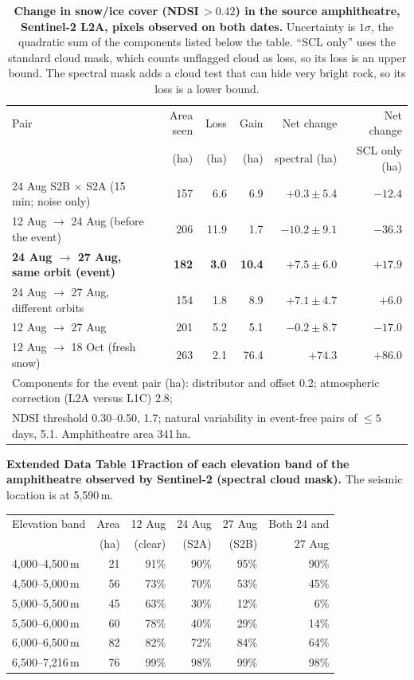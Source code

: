 \documentclass{nature}
\begin{document}
\begin{table}
\caption{\textbf{Change in snow/ice cover (NDSI\,$>0.42$) in the source amphitheatre, Sentinel-2 L2A, pixels observed on both dates.} Uncertainty is $1\sigma$, the quadratic sum of the components listed below the table. ``SCL only'' uses the standard cloud mask, which counts unflagged cloud as loss, so its loss is an upper bound. The spectral mask adds a cloud test that can hide very bright rock, so its loss is a lower bound.}
\centering\small
\begin{tabular}{lrrrrr}
\hline
Pair & Area seen & Loss & Gain & Net change & Net change \\
 & (ha) & (ha) & (ha) & spectral (ha) & SCL only (ha) \\
\hline
24 Aug S2B $\times$ S2A (15\,min; noise only) & 157 & 6.6 & 6.9 & $+0.3\pm5.4$ & $-12.4$ \\
12 Aug $\to$ 24 Aug (before the event) & 206 & 11.9 & 1.7 & $-10.2\pm9.1$ & $-36.3$ \\
\textbf{24 Aug $\to$ 27 Aug, same orbit (event)} & \textbf{182} & \textbf{3.0} & \textbf{10.4} & $\mathbf{+7.5\pm6.0}$ & $\mathbf{+17.9}$ \\
24 Aug $\to$ 27 Aug, different orbits & 154 & 1.8 & 8.9 & $+7.1\pm4.7$ & $+6.0$ \\
12 Aug $\to$ 27 Aug & 201 & 5.2 & 5.1 & $-0.2\pm8.7$ & $-17.0$ \\
12 Aug $\to$ 18 Oct (fresh snow) & 263 & 2.1 & 76.4 & $+74.3$ & $+86.0$ \\
\hline
\multicolumn{6}{l}{\footnotesize Components for the event pair (ha): distributor and offset 0.2; atmospheric correction (L2A versus L1C) 2.8;}\\
\multicolumn{6}{l}{\footnotesize NDSI threshold 0.30--0.50, 1.7; natural variability in event-free pairs of $\leq5$\,days, 5.1. Amphitheatre area 341\,ha.}\\
\end{tabular}
\end{table}

\begin{table}
\noindent\textbf{Extended Data Table 1\enspace Fraction of each elevation band of the amphitheatre observed by Sentinel-2 (spectral cloud mask).} The seismic location is at 5,590\,m.\par\medskip
\centering\small
\begin{tabular}{lrrrrr}
\hline
Elevation band & Area & 12 Aug & 24 Aug & 27 Aug & Both 24 and \\
 & (ha) & (clear) & (S2A) & (S2B) & 27 Aug \\
\hline
4,000--4,500\,m & 21 & 91\% & 90\% & 95\% & 90\% \\
4,500--5,000\,m & 56 & 73\% & 70\% & 53\% & 45\% \\
5,000--5,500\,m & 45 & 63\% & 30\% & 12\% & 6\% \\
5,500--6,000\,m & 60 & 78\% & 40\% & 29\% & 14\% \\
6,000--6,500\,m & 82 & 82\% & 72\% & 84\% & 64\% \\
6,500--7,216\,m & 76 & 99\% & 98\% & 99\% & 98\% \\
\hline
\end{tabular}
\end{table}
\end{document}
